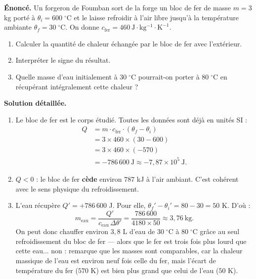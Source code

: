 \documentclass[11pt]{article}
\begin{document}
\begin{exoresolu}
\textbf{Énoncé.} Un forgeron de Foumban sort de la forge un bloc de fer de masse $m = 3$ kg porté à $\theta_i = 600\;^\circ\mathrm{C}$ et le laisse refroidir à l'air libre jusqu'à la température ambiante $\theta_f = 30\;^\circ\mathrm{C}$. On donne $c_{\text{fer}} = 460\ \mathrm{J\cdot kg^{-1}\cdot K^{-1}}$.
\begin{enumerate}
\item Calculer la quantité de chaleur échangée par le bloc de fer avec l'extérieur.
\item Interpréter le signe du résultat.
\item Quelle masse d'eau initialement à $30\;^\circ\mathrm{C}$ pourrait-on porter à $80\;^\circ\mathrm{C}$ en récupérant intégralement cette chaleur ?
\end{enumerate}
\tcblower
\textbf{Solution détaillée.}
\begin{enumerate}
\item Le bloc de fer est le corps étudié. Toutes les données sont déjà en unités SI :
\begin{align*}
Q &= m \cdot c_{\text{fer}} \cdot (\theta_f - \theta_i) \\
  &= 3 \times 460 \times (30 - 600) \\
  &= 3 \times 460 \times (-570) \\
  &= -786\,600\ \mathrm{J} \approx -7,87 \times 10^{5}\ \mathrm{J}.
\end{align*}
\item $Q < 0$ : le bloc de fer \textbf{cède} environ $787$ kJ à l'air ambiant. C'est cohérent avec le sens physique du refroidissement.
\item L'eau récupère $Q' = +786\,600$ J. Pour elle, $\theta_f' - \theta_i' = 80 - 30 = 50$ K. D'où :
\[
m_{\text{eau}} = \frac{Q'}{c_{\text{eau}}\,\Delta\theta'} = \frac{786\,600}{4180 \times 50} \approx 3{,}76\ \mathrm{kg}.
\]
On peut donc chauffer environ $3,8$ L d'eau de $30\;^\circ\mathrm{C}$ à $80\;^\circ\mathrm{C}$ grâce au seul refroidissement du bloc de fer — alors que le fer est trois fois plus lourd que cette eau... non : remarque que les masses sont comparables, car la chaleur massique de l'eau est environ neuf fois celle du fer, mais l'écart de température du fer ($570$ K) est bien plus grand que celui de l'eau ($50$ K).
\end{enumerate}
\end{exoresolu}
\end{document}
